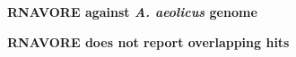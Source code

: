 \documentclass[landscape]{slides}
\begin{document}
\begin{slide}
\begin{center}
\small
\textbf{RNAVORE against \emph{A. aeolicus} genome}
\end{center}


\vfill
\end{slide}
\begin{slide}
\begin{center}
\small
\textbf{RNAVORE does not report overlapping hits}
\end{center}


\vfill
\end{slide}
%
%
%
%
\end{document}
